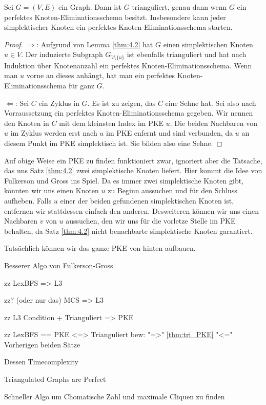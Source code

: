 \documentclass[../main.tex]{subfiles}
\begin{document}
\begin{satz} \label{thm:tri_PKE}
    Sei $G = (V, E)$ ein Graph. Dann ist $G$ trianguliert, genau dann wenn $G$ ein perfektes Knoten-Eliminationsschema besitzt. Insbesondere kann jeder simplektischer Knoten ein perfektes Knoten-Eliminationsschema starten.
\end{satz}
\begin{proof}
    $\Rightarrow$: Aufgrund von Lemma \ref{thm:4.2} hat $G$ einen simplektischen Knoten $u \in V$. Der induzierte Subgraph $G_{V \setminus \{u\}}$ ist ebenfalls trianguliert und hat nach Induktion über Knotenanzahl ein perfektes Knoten-Eliminationsschema. Wenn man $u$ vorne an dieses anhängt, hat man ein perfektes Knoten-Eliminationsschema für ganz $G$.
    
    $\Leftarrow$: Sei $C$ ein Zyklus in $G$. Es ist zu zeigen, das $C$ eine Sehne hat. Sei also nach Vorraussetzung ein perfektes Knoten-Eliminationsschema gegeben. Wir nennen den Knoten in $C$ mit dem kleinsten Index im PKE $u$. Die beiden Nachbaren von $u$ im Zyklus werden erst nach $u$ im PKE enfernt und sind verbunden, da $u$ an diesem Punkt im PKE simplektisch ist. Sie bilden also eine Sehne.
\end{proof}    
    
Auf obige Weise ein PKE zu finden funktioniert zwar, ignoriert aber die Tatsache, das uns Satz \ref{thm:4.2} zwei simplektische Knoten liefert. Hier kommt die Idee von Fulkerson und Gross ins Spiel. Da es immer zwei simplektische Knoten gibt, könnten wir uns einen Knoten $u$ zu Beginn aussuchen und für den Schluss aufheben. Falls $u$ einer der beiden gefundenen simplektischen Knoten ist, entfernen wir stattdessen einfach den anderen. Desweiteren können wir uns einen Nachbaren $v$ von $u$ aussuchen, den wir uns für die vorletze Stelle im PKE behalten, da Satz \ref{thm:4.2} nicht benachbarte simplektische Knoten garantiert.

Tatsächlich können wir das ganze PKE von hinten aufbauen.





Besserer Algo von Fulkerson-Gross

zz
LexBFS => L3

zz? (oder nur das)
MCS => L3

zz
L3 Condition + Trianguliert => PKE

zz
LexBFS == PKE <=> Trianguliert
bew: "=>" \ref{thm:tri_PKE}
"<=" Vorherigen beiden Sätze

Dessen Timecomplexity

Triangulated Graphs are Perfect

Schneller Algo um Chomatische Zahl und maximale Cliquen zu finden
\end{document}
